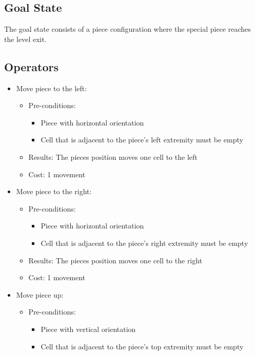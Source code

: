 \documentclass[conference]{IEEEtran}
\begin{document}
\subsection{Goal State}
The goal state consists of a piece configuration where the special piece reaches the level exit.

\subsection{Operators}
\begin{itemize}
    \item Move piece to the left:
    \begin{itemize}
        \item Pre-conditions:
        \begin{itemize}
            \item Piece with horizontal orientation
            \item Cell that is adjacent to the piece's left extremity must be empty
        \end{itemize}
        \item Results: The pieces position moves one cell to the left
        \item Cost: 1 movement
    \end{itemize}
    \item Move piece to the right:
    \begin{itemize}
        \item Pre-conditions:
        \begin{itemize}
            \item Piece with horizontal orientation
            \item Cell that is adjacent to the piece's right extremity must be empty
        \end{itemize}
        \item Results: The pieces position moves one cell to the right
        \item Cost: 1 movement
    \end{itemize}
    \item Move piece up:
        \begin{itemize}
        \item Pre-conditions:
        \begin{itemize}
            \item Piece with vertical orientation
            \item Cell that is adjacent to the piece's top extremity must be empty

\end{itemize}
\end{itemize}
\end{itemize}
\end{document}

